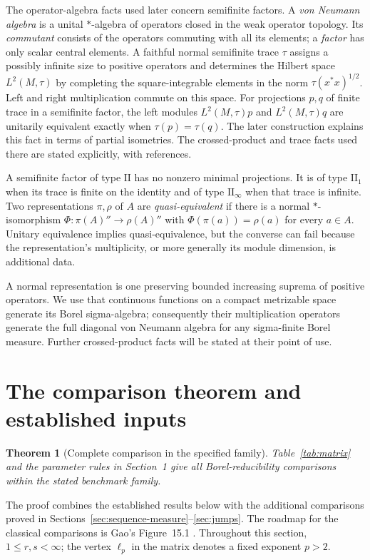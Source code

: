 \documentclass[11pt]{article}
\numberwithin{equation}{section}
\newtheorem{theorem}{Theorem}[section]
\theoremstyle{definition}
\begin{document}
The operator-algebra facts used later concern semifinite factors.
A \emph{von Neumann algebra} is a unital $*$-algebra of operators
closed in the weak operator topology. Its \emph{commutant} consists
of the operators commuting with all its elements; a \emph{factor}
has only scalar central elements. A faithful normal semifinite trace
$\tau$ assigns a possibly infinite size to positive operators and
determines the Hilbert space $L^2(M,\tau)$ by completing the
square-integrable elements in the norm $\tau(x^*x)^{1/2}$.
Left and right multiplication commute on this space.
For projections $p,q$ of finite trace in a semifinite factor,
the left modules $L^2(M,\tau)p$ and $L^2(M,\tau)q$ are unitarily
equivalent exactly when $\tau(p)=\tau(q)$. The later construction
explains this fact in terms of partial isometries. The crossed-product
and trace facts used there are stated explicitly, with references.

A semifinite factor of type $\mathrm{II}$ has no nonzero minimal
projections. It is of type $\mathrm{II}_1$ when its trace is finite on
the identity and of type $\mathrm{II}_\infty$ when that trace is infinite.
Two representations $\pi,\rho$ of $A$ are \emph{quasi-equivalent} if
there is a normal $*$-isomorphism
$\Phi:\pi(A)''\to\rho(A)''$ with $\Phi(\pi(a))=\rho(a)$ for every
$a\in A$. Unitary equivalence implies quasi-equivalence, but the
converse can fail because the representation's multiplicity, or more
generally its module dimension, is additional data.


A normal representation is one preserving bounded increasing suprema
of positive operators. We use that continuous functions on a compact
metrizable space generate its Borel sigma-algebra; consequently their
multiplication operators generate the full diagonal von Neumann algebra
for any sigma-finite Borel measure. Further crossed-product facts will
be stated at their point of use.

\section{The comparison theorem and established inputs}\label{sec:established}

\begin{theorem}[Complete comparison in the specified family]\label{thm:matrix}
Table~\ref{tab:matrix} and the parameter rules in Section~1 give all
Borel-reducibility comparisons within the stated benchmark family.
\end{theorem}
The proof combines the established results below with the additional
comparisons proved in Sections~\ref{sec:sequence-measure}--\ref{sec:jumps}.
The roadmap for the classical comparisons is Gao's Figure~15.1
\cite[Section~15.2]{Gao}.
Throughout this section, $1\leq r,s<\infty$; the vertex $\ell_p$ in the
matrix denotes a fixed exponent $p>2$.
\end{document}
